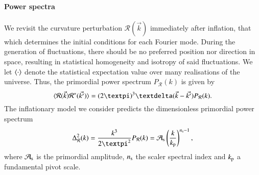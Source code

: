 









\paragraph{Power spectra}
We revisit the curvature perturbation $\mathcal{R}(\vec{k})$ immediately after inflation, that which determines the initial conditions for each Fourier mode. During the generation of fluctuations, there should be no preferred position nor direction in space, resulting in statistical homogeneity and isotropy of said fluctuations. We let $\langle \cdot \rangle$ denote the statistical expectation value over many realisations of the universe. Thus, the primordial power spectrum $P_\mathcal{R}(k)$ is given by
\begin{equation}\label{mil4:theo:eq:primordial_power_spectum}
    \avg{\mathcal{R}(\vec{k})\mathcal{R}^*(\vec{k'})} = (2\pi)^3 \deltafunc{\vec{k}-\vec{k'}}P_\mathcal{R}(k).
\end{equation}
The inflationary model we consider predicts the dimensionless primordial power spectrum
\begin{equation}\label{mil4:theo:eq:Delta_R_of_k}
    \Delta^2_\mathcal{R} (k) = \frac{k^3}{2\pi^2} P_\mathcal{R} (k)= \As \left( \frac{k}{k\ped{p}} \right)^{\ns -1},
\end{equation}
where $\mathcal{A}_\mathrm{s}$ is the primordial amplitude, $n_\mathrm{s}$ the scaler spectral index and $k_\mathrm{p}$ a fundamental pivot scale.

